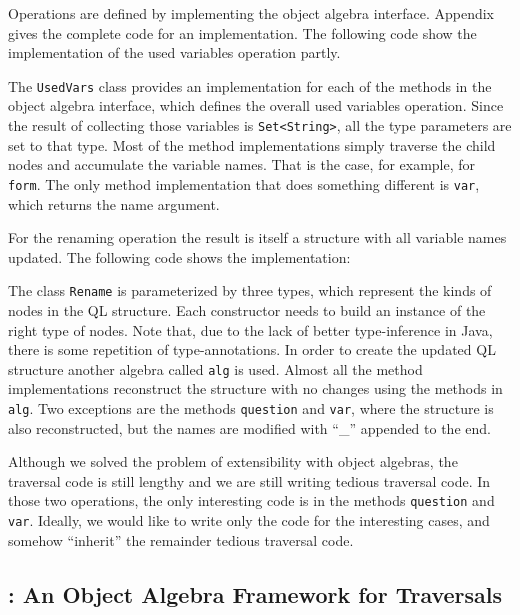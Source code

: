 Operations are defined by implementing the object algebra interface. Appendix gives the complete code for an implementation.
The following code show the implementation of the used variables
operation partly.


The \lstinline{UsedVars} class provides an implementation for each
of the methods in the object algebra interface, which defines the
overall used variables operation. Since the result of collecting those
variables is \lstinline{Set<String>}, all the type parameters are set to
that type. Most of the method implementations simply traverse the
child nodes and accumulate the variable names. That is the case, for
example, for \lstinline{form}. The only method implementation that does
something different is \lstinline{var}, which returns the name
argument.

For the renaming operation the result is itself a structure
with all variable names updated. The following code shows the
implementation:


The class \lstinline{Rename} is parameterized by three types,
which represent the kinds of nodes in the QL structure. Each
constructor needs to build an instance of the right type of nodes.
Note that, due to the lack of better type-inference in Java, there is
some repetition of type-annotations. In order to create the updated
QL structure another algebra called \lstinline{alg} is used.
Almost all the method implementations reconstruct the structure with
no changes using the methods in \lstinline{alg}. Two exceptions are the
methods \lstinline{question} and \lstinline{var}, where the structure is also reconstructed, but
the names are modified with ``\_'' appended to the end.

Although we solved the problem of extensibility with object
algebras, the traversal code is still lengthy and we are still writing
tedious traversal code. In those two operations, the only interesting code
is in the methods \lstinline{question} and \lstinline{var}. Ideally, we would like to write only
the code for the interesting cases, and somehow ``inherit'' the
remainder tedious traversal code.

\subsection{\Name: An Object Algebra Framework for Traversals}

